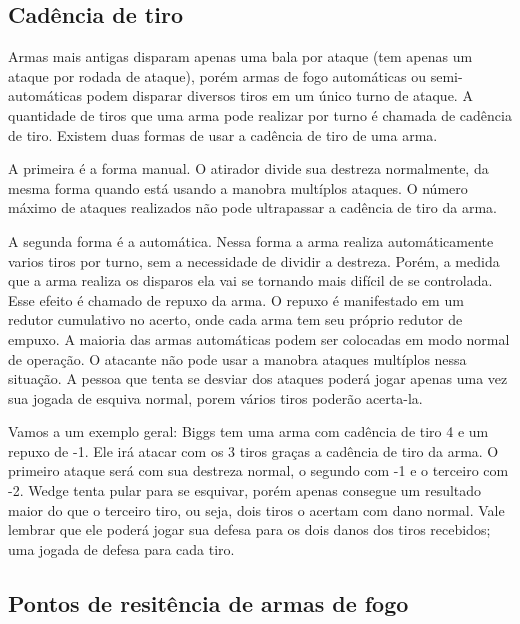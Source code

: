 \subsection{Cadência de tiro}
 
Armas mais antigas disparam apenas uma bala por ataque (tem apenas um ataque por rodada de ataque), porém armas de fogo automáticas ou semi-automáticas podem disparar diversos tiros em um único turno de ataque. A quantidade de tiros que uma arma pode realizar por turno é chamada de cadência de tiro. Existem duas formas de usar a cadência de tiro de uma arma. 

A primeira é a forma manual. O atirador divide sua destreza normalmente, da mesma forma quando está usando a manobra multíplos ataques. O número máximo de ataques realizados não pode ultrapassar a cadência de tiro da arma. 

A segunda forma é a automática. Nessa forma a arma realiza automáticamente varios tiros por turno, sem a necessidade de dividir a destreza. Porém, a medida que a arma realiza os disparos ela vai se tornando mais difícil de se controlada. Esse efeito é chamado de repuxo da arma. O repuxo é manifestado em um redutor cumulativo no acerto, onde cada arma tem seu próprio redutor de empuxo. A maioria das armas automáticas podem ser colocadas em modo normal de operação. O atacante não pode usar a manobra ataques multíplos nessa situação. A pessoa que tenta se desviar dos ataques poderá jogar apenas uma vez sua jogada de esquiva normal, porem vários tiros poderão acerta-la. 

Vamos a um exemplo geral: Biggs tem uma arma com cadência de tiro 4 e um repuxo de -1. Ele irá atacar com os 3 tiros graças a cadência de tiro da arma. O primeiro ataque será com sua destreza normal, o segundo com -1 e o terceiro com -2. Wedge tenta pular para se esquivar, porém apenas consegue um resultado maior do que o terceiro tiro, ou seja, dois tiros o acertam com dano normal. Vale lembrar que ele poderá jogar sua defesa para os dois danos dos tiros recebidos; uma jogada de defesa para cada tiro.

\subsection{Pontos de resitência de armas de fogo}

